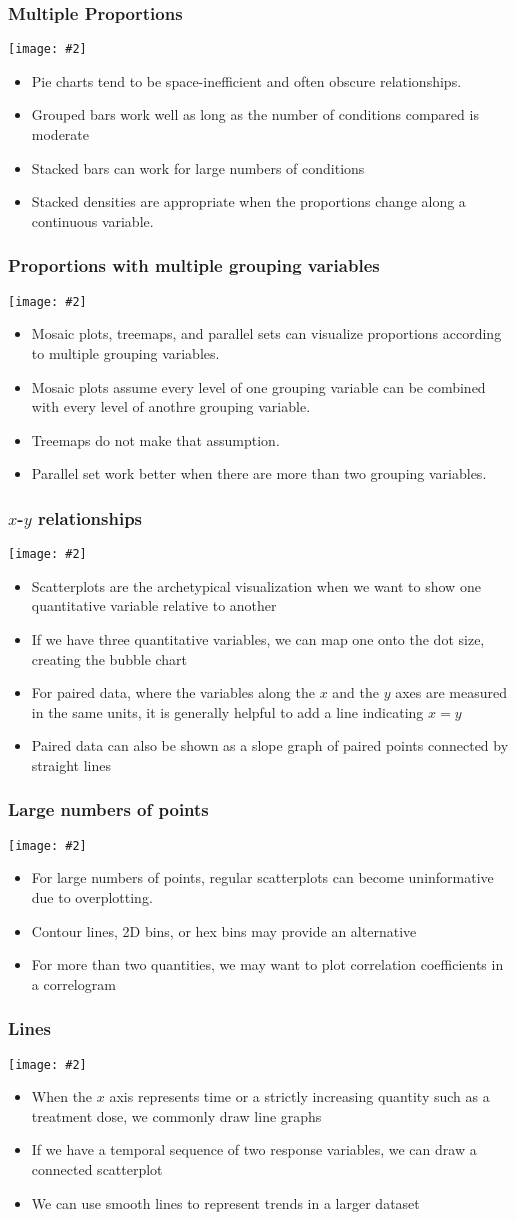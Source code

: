\documentclass{beamer}
\newcommand{\bi}{\begin{itemize}}
\newcommand{\li}{\item}
\newcommand{\ei}{\end{itemize}}
\newcommand{\fig}[2]{\centerline{\texttt{[image: \#2]}}}
\newcommand{\bfr}[1]{\begin{frame}[fragile]\frametitle{{ #1 }}}
\begin{document}
\bfr{Multiple Proportions}
\fig{1}{proportions-comp-1.png}
\bi
\li Pie charts tend to be space-inefficient and often obscure relationships.
\li Grouped bars work well as long as the number of conditions compared is moderate
\li Stacked bars can work for large numbers of conditions
\li Stacked densities are appropriate when the proportions change along a continuous variable.
\ei
\end{frame}

\bfr{Proportions with multiple grouping variables}

\fig{1}{proportions-multi-1.png}
\bi
\li Mosaic plots, treemaps, and parallel sets can visualize
proportions according to multiple grouping variables.
\li Mosaic plots assume every level of one grouping variable
can be combined with every level of anothre grouping variable.
\li Treemaps do not make that assumption.
\li Parallel set work better when there are more than
two grouping variables.
\ei
\end{frame}

\bfr{$x$-$y$ relationships}

\fig{1}{basic-scatter-1.png}
\bi
\li Scatterplots are the archetypical visualization when we want to show one quantitative variable relative to another
\li If we have three quantitative variables, we can map one onto the dot size, creating  the  bubble chart
\li For paired data, where the variables along the $x$ and the $y$ axes are measured in the same units, it is generally helpful to add a line indicating $x=y$
\li Paired data can also be shown as a slope graph of paired points connected by straight lines
\ei
\end{frame}

\bfr{Large numbers of points}

\fig{1}{xy-binning-1.png}
\bi
\li For large numbers of points, regular scatterplots can become uninformative due to overplotting.
\li Contour lines, 2D bins, or hex bins may provide an alternative
\li For more than two quantities, we may want to plot correlation
coefficients in a correlogram
\ei

\end{frame}

\bfr{Lines}
\fig{1}{xy-lines-1.png}
\bi
\li When the $x$ axis represents time or a strictly increasing quantity such as a treatment dose, we commonly draw line graphs 
\li If we have a temporal sequence of two response variables, we can draw a connected scatterplot
\li We can use smooth lines to represent trends in a larger dataset
\ei
\end{frame}
\end{document}
